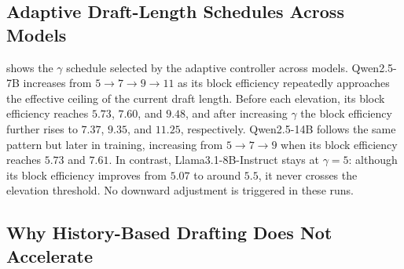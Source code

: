 \documentclass{llmxive}
\providecommand{\history}{history-based drafting}
\providecommand{\MAL}{block efficiency}
\providecommand{\arraystretch}{1.18}
\begin{document}
\subsection{Adaptive Draft-Length Schedules Across Models}
\label{app:adaptive_gamma_schedule}

 shows the $\gamma$ schedule selected by the adaptive controller across models.
Qwen2.5-7B increases from $5 \rightarrow 7 \rightarrow 9 \rightarrow 11$ as its \MAL{} repeatedly approaches the effective ceiling of the current draft length.
Before each elevation, its \MAL{} reaches $5.73$, $7.60$, and $9.48$, and after increasing $\gamma$ the \MAL{} further rises to $7.37$, $9.35$, and $11.25$, respectively.
Qwen2.5-14B follows the same pattern but later in training, increasing from $5 \rightarrow 7 \rightarrow 9$ when its \MAL{} reaches $5.73$ and $7.61$.
In contrast, Llama3.1-8B-Instruct stays at $\gamma=5$: although its \MAL{} improves from $5.07$ to around $5.5$, it never crosses the elevation threshold.
No downward adjustment is triggered in these runs.

\begin{table}[t]
\centering
\small
\setlength{\tabcolsep}{5.0pt}
\renewcommand{\arraystretch}{1.10}
\vspace{1mm}
\label{tab:history_based_slow}
\caption{
Active-window analysis of \history{} after rollout history becomes available.
Statistics are reported from the second epoch onward.
}
\end{table}

\subsection{Why History-Based Drafting Does Not Accelerate}
\label{app:why-history-slow}
\end{document}
